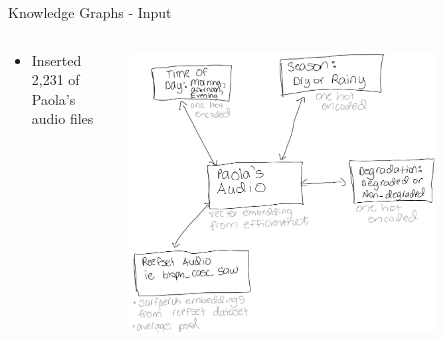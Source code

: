 
\begin{frame}{Knowledge Graphs - Input}
    \begin{columns}
        \begin{column}{0.3\textwidth}
            \begin{itemize}
                \item Inserted 2,231 of Paola's audio files
            \end{itemize}
        \end{column}
        \begin{column}{0.7\textwidth}
            \centering
            \includegraphics[height=0.8\textheight,width=0.8\textwidth,keepaspectratio]{images/knowledge_graph.png}
        \end{column}
    \end{columns}
\end{frame}

